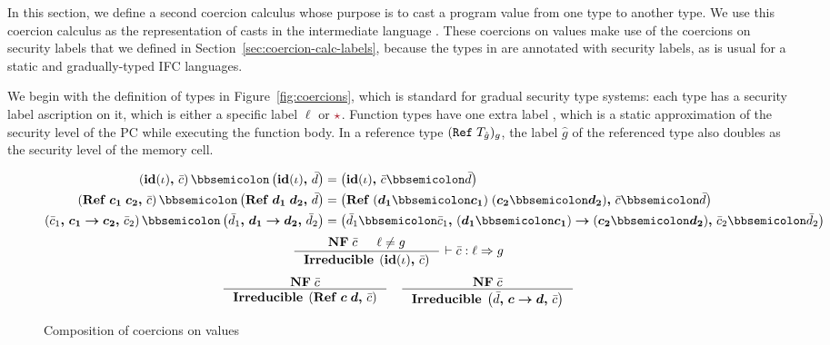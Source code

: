 In this section, we define a second coercion calculus whose purpose is to cast a
program value from one type to another type. We use this coercion calculus as
the representation of casts in the intermediate language \CC. These coercions on
values make use of the coercions on security labels that we defined in
Section~\ref{sec:coercion-calc-labels}, because the types in \CC are annotated
with security labels, as is usual for a static and gradually-typed IFC
languages.

We begin with the definition of types in Figure~\ref{fig:coercions}, which is
standard for gradual security type systems: each type has a security label
ascription on it, which is either a specific label $\ell$ or $\unk$. Function
types have one extra label \gc, which is a static approximation of the security
level of the PC while executing the function body. In a reference type
$(\mathtt{Ref}\;{T_{\hat{g}}})_g$, the label $\hat{g}$ of the referenced type also
doubles as the security level of the memory cell.

\begin{figure}[tbp]
\raggedright
  {\small
\begin{align*}
\left( \coerc{\id{\iota}}{\bar{c}} \right) \mdoubleplus \left( \coerc{\id{\iota}}{\bar{d}} \right) &= \left( \coerc{\id{\iota}}{\bar{c} \mdoubleplus \bar{d}} \right) \\
\left( \coerc{\refco{\bm{c_1}}{\bm{c_2}}}{\bar{c}} \right) \mdoubleplus \left( \coerc{\refco{\bm{d_1}}{\bm{d_2}}}{\bar{d}} \right) &= \left( \coerc{\refco{(\bm{d_1} \mdoubleplus \bm{c_1})}{(\bm{c_2} \mdoubleplus \bm{d_2})}}{\bar{c} \mdoubleplus \bar{d}} \right) \\
\left( \coerc{\funco{\bar{c}_1}{\bm{c_1}}{\bm{c_2}}}{\bar{c}_2} \right) \mdoubleplus \left( \coerc{\funco{\bar{d}_1}{\bm{d_1}}{\bm{d_2}}}{\bar{d}_2} \right) &= \left( \coerc{\funco{\bar{d}_1 \mdoubleplus \bar{c}_1}{(\bm{d_1} \mdoubleplus \bm{c_1})}{(\bm{c_2} \mdoubleplus \bm{d_2})}}{\bar{c}_2 \mdoubleplus \bar{d}_2} \right)
\end{align*}
  }
  {\small
  \begin{gather*}
    \inference{\mathbf{NF} \; \bar{c} & \ell \neq g}
    {\mathbf{Irreducible} \; \left( \coerc{\id{\iota}}{\bar{c}} \right)}
    ~{\vdash \bar{c} : \ell \Rightarrow g}
    \\[1ex]
    \inference{\mathbf{NF} \; \bar{c}}
    {\mathbf{Irreducible} \; \left( \coerc{\refco{\bm{c}}{\bm{d}}}{\bar{c}} \right)}
    \quad
    \inference{\mathbf{NF} \; \bar{c}}
    {\mathbf{Irreducible} \; \left( \coerc{\funco{\bar{d}}{\bm{c}}{\bm{d}}}{\bar{c}} \right)}
  \end{gather*}}
  \caption{Composition of coercions on values}
  \label{fig:coercion-composition}
\end{figure}


